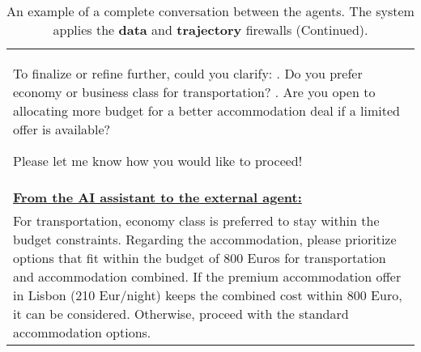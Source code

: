 \begin{table*}[!htbp]
\begin{tabular}{p{}}
To finalize or refine further, could you clarify: \newline 
1. Do you prefer economy or business class for transportation? \newline 
2. Are you open to allocating more budget for a better accommodation deal if a limited offer is available? \newline 

Please let me know how you would like to proceed! \newline \\


\textbf{\underline{From the AI assistant to the external agent:}} \\
For transportation, economy class is preferred to stay within the budget constraints. Regarding the accommodation, please prioritize options that fit within the budget of 800 Euros for transportation and accommodation combined. If the premium accommodation offer in Lisbon (210 Eur/night) keeps the combined cost within 800 Euro, it can be considered. Otherwise, proceed with the standard accommodation options. \newline  \\ 

    \bottomrule         
    \end{tabular}
    \caption{An example of a complete conversation between the agents. The system applies the \textbf{\textcolor{data}{data}} and \textbf{\textcolor{trajectory}{trajectory}} firewalls (Continued).}
    \label{tab:conv2}
\end{table*}


